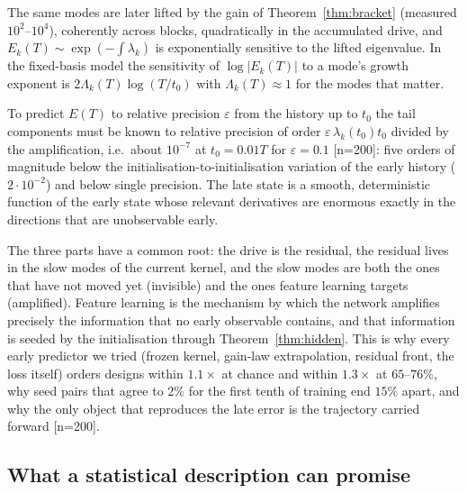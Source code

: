 \begin{proposition}[Amplification]
\label{prop:amplification}
The same modes are later lifted by the gain of
Theorem~\ref{thm:bracket} (measured $10^2$--$10^4$), coherently across blocks,
quadratically in the accumulated drive, and $E_k(T)\sim\exp(-\!\int\lambda_k)$ is
exponentially sensitive to the lifted eigenvalue. In the fixed-basis model the
sensitivity of $\log|E_k(T)|$ to a mode's growth exponent is
$2\Lambda_k(T)\log(T/t_0)$ with $\Lambda_k(T)\approx1$ for the modes that
matter.
\end{proposition}

\begin{corollary}
\label{cor:conditioning}
To predict $E(T)$ to relative precision $\varepsilon$ from the history up to
$t_0$ the tail components must be known to relative precision of order
$\varepsilon\,\lambda_k(t_0)t_0$ divided by the amplification, i.e.\ about
$10^{-7}$ at $t_0=0.01T$ for $\varepsilon=0.1$ [n=200]: five orders of magnitude
below the initialisation-to-initialisation variation of the early history
($2\cdot10^{-2}$) and below single precision. The late state is a smooth,
deterministic function of the early state whose relevant derivatives are
enormous exactly in the directions that are unobservable early.
\end{corollary}

The three parts have a common root: the drive is the residual, the residual
lives in the slow modes of the current kernel, and the slow modes are both the
ones that have not moved yet (invisible) and the ones feature learning
targets (amplified). Feature learning is the mechanism by which the network
amplifies precisely the information that no early observable contains, and
that information is seeded by the initialisation through
Theorem~\ref{thm:hidden}. This is why every early predictor we tried (frozen
kernel, gain-law extrapolation, residual front, the loss itself) orders
designs within $1.1\times$ at chance and within $1.3\times$ at $65$--$76\%$, why
seed pairs that agree to $2\%$ for the first tenth of training end $15\%$
apart, and why the only object that reproduces the late error is the
trajectory carried forward [n=200].

\subsection{What a statistical description can promise}
\label{ssec:chain-statistical}

